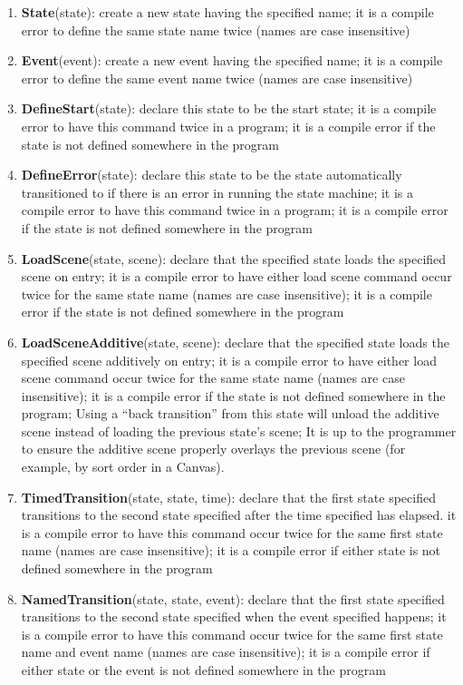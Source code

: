 \documentclass[letter,12pt]{article}
\begin{document}
\begin{enumerate}

\item \textbf{State}(state): create a new state having the specified name; it is a compile error to define the same state name twice (names are case insensitive)
\item \textbf{Event}(event): create a new event having the specified name;  it is a compile error to define the same event name twice (names are case insensitive)
\item \textbf{DefineStart}(state): declare this state to be the start state; it is a compile error to have this command twice in a program; it is a compile error if the state is not defined somewhere in the program
\item \textbf{DefineError}(state): declare this state to be the state automatically transitioned to if there is an error in running the state machine; it is a compile error to have this command twice in a program; it is a compile error if the state is not defined somewhere in the program
\item \textbf{LoadScene}(state, scene): declare that the specified state loads the specified scene on entry; it is a compile error to have either load scene command occur twice for the same state name (names are case insensitive); it is a compile error if the state is not defined somewhere in the program
\item \textbf{LoadSceneAdditive}(state, scene): declare that the specified state loads the specified scene additively on entry; it is a compile error to have either load scene command occur twice for the same state name (names are case insensitive); it is a compile error if the state is not defined somewhere in the program; Using a “back transition” from this state will unload the additive scene instead of loading the previous state’s scene;  It is up to the programmer to ensure the additive scene properly overlays the previous scene (for example, by sort order in a Canvas).
\item \textbf{TimedTransition}(state, state, time): declare that the first state specified transitions to the second state specified after the time specified has elapsed. it is a compile error to have this command occur twice for the same first state name (names are case insensitive); it is a compile error if either state is not defined somewhere in the program
\item \textbf{NamedTransition}(state, state, event): declare that the first state specified transitions to the second state specified when the event specified happens; it is a compile error to have this command occur twice for the same first state name and event name (names are case insensitive); it is a compile error if either state or the event is not defined somewhere in the program

\end{enumerate}
\end{document}
